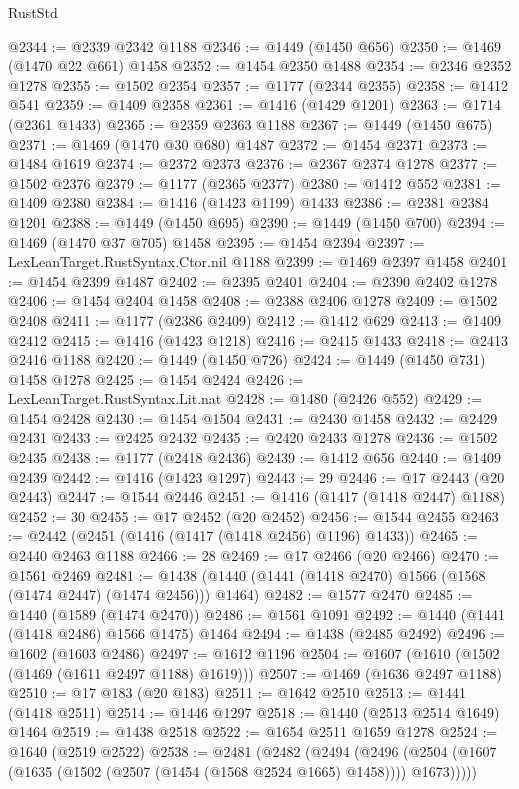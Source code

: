 \begin{lexlean}{RustStd}
\begin{coremodule}
@2344 := @2339 @2342 @1188
@2346 := @1449 (@1450 @656)
@2350 := @1469 (@1470 @22 @661) @1458
@2352 := @1454 @2350 @1488
@2354 := @2346 @2352 @1278
@2355 := @1502 @2354
@2357 := @1177 (@2344 @2355)
@2358 := @1412 @541
@2359 := @1409 @2358
@2361 := @1416 (@1429 @1201)
@2363 := @1714 (@2361 @1433)
@2365 := @2359 @2363 @1188
@2367 := @1449 (@1450 @675)
@2371 := @1469 (@1470 @30 @680) @1487
@2372 := @1454 @2371
@2373 := @1484 @1619
@2374 := @2372 @2373
@2376 := @2367 @2374 @1278
@2377 := @1502 @2376
@2379 := @1177 (@2365 @2377)
@2380 := @1412 @552
@2381 := @1409 @2380
@2384 := @1416 (@1423 @1199) @1433
@2386 := @2381 @2384 @1201
@2388 := @1449 (@1450 @695)
@2390 := @1449 (@1450 @700)
@2394 := @1469 (@1470 @37 @705) @1458
@2395 := @1454 @2394
@2397 := LexLeanTarget.RustSyntax.Ctor.nil @1188
@2399 := @1469 @2397 @1458
@2401 := @1454 @2399 @1487
@2402 := @2395 @2401
@2404 := @2390 @2402 @1278
@2406 := @1454 @2404 @1458
@2408 := @2388 @2406 @1278
@2409 := @1502 @2408
@2411 := @1177 (@2386 @2409)
@2412 := @1412 @629
@2413 := @1409 @2412
@2415 := @1416 (@1423 @1218)
@2416 := @2415 @1433
@2418 := @2413 @2416 @1188
@2420 := @1449 (@1450 @726)
@2424 := @1449 (@1450 @731) @1458 @1278
@2425 := @1454 @2424
@2426 := LexLeanTarget.RustSyntax.Lit.nat
@2428 := @1480 (@2426 @552)
@2429 := @1454 @2428
@2430 := @1454 @1504
@2431 := @2430 @1458
@2432 := @2429 @2431
@2433 := @2425 @2432
@2435 := @2420 @2433 @1278
@2436 := @1502 @2435
@2438 := @1177 (@2418 @2436)
@2439 := @1412 @656
@2440 := @1409 @2439
@2442 := @1416 (@1423 @1297)
@2443 := 29
@2446 := @17 @2443 (@20 @2443)
@2447 := @1544 @2446
@2451 := @1416 (@1417 (@1418 @2447) @1188)
@2452 := 30
@2455 := @17 @2452 (@20 @2452)
@2456 := @1544 @2455
@2463 := @2442 (@2451 (@1416 (@1417 (@1418 @2456) @1196) @1433))
@2465 := @2440 @2463 @1188
@2466 := 28
@2469 := @17 @2466 (@20 @2466)
@2470 := @1561 @2469
@2481 := @1438 (@1440 (@1441 (@1418 @2470) @1566 (@1568 (@1474 @2447) (@1474 @2456))) @1464)
@2482 := @1577 @2470
@2485 := @1440 (@1589 (@1474 @2470))
@2486 := @1561 @1091
@2492 := @1440 (@1441 (@1418 @2486) @1566 @1475) @1464
@2494 := @1438 (@2485 @2492)
@2496 := @1602 (@1603 @2486)
@2497 := @1612 @1196
@2504 := @1607 (@1610 (@1502 (@1469 (@1611 @2497 @1188) @1619)))
@2507 := @1469 (@1636 @2497 @1188)
@2510 := @17 @183 (@20 @183)
@2511 := @1642 @2510
@2513 := @1441 (@1418 @2511)
@2514 := @1446 @1297
@2518 := @1440 (@2513 @2514 @1649) @1464
@2519 := @1438 @2518
@2522 := @1654 @2511 @1659 @1278
@2524 := @1640 (@2519 @2522)
@2538 := @2481
    (@2482
      (@2494
        (@2496 (@2504 (@1607 (@1635 (@1502 (@2507 (@1454 (@1568 @2524 @1665) @1458)))) @1673)))))

\end{coremodule}
\end{lexlean}

